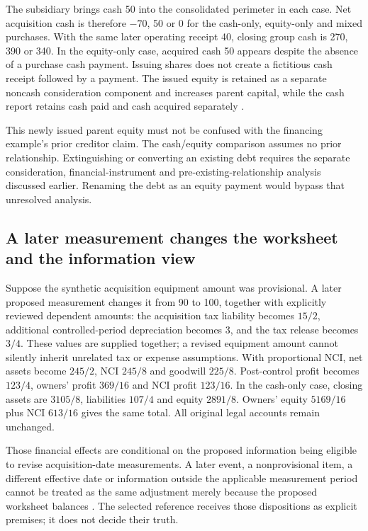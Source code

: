 The subsidiary brings cash 50 into the consolidated perimeter in each case. Net acquisition cash is therefore $-70$, 50 or 0 for the cash-only, equity-only and mixed purchases. With the same later operating receipt 40, closing group cash is 270, 390 or 340. In the equity-only case, acquired cash 50 appears despite the absence of a purchase cash payment. Issuing shares does not create a fictitious cash receipt followed by a payment. The issued equity is retained as a separate noncash consideration component and increases parent capital, while the cash report retains cash paid and cash acquired separately \citep[paras.~39--44B]{aasb107acquisition2026}.

This newly issued parent equity must not be confused with the financing example's prior creditor claim. The cash/equity comparison assumes no prior relationship. Extinguishing or converting an existing debt requires the separate consideration, financial-instrument and pre-existing-relationship analysis discussed earlier. Renaming the debt as an equity payment would bypass that unresolved analysis.

\subsection{A later measurement changes the worksheet and the information view}

Suppose the synthetic acquisition equipment amount was provisional. A later proposed measurement changes it from 90 to 100, together with explicitly reviewed dependent amounts: the acquisition tax liability becomes $15/2$, additional controlled-period depreciation becomes 3, and the tax release becomes $3/4$. These values are supplied together; a revised equipment amount cannot silently inherit unrelated tax or expense assumptions. With proportional NCI, net assets become $245/2$, NCI $245/8$ and goodwill $225/8$. Post-control profit becomes $123/4$, owners' profit $369/16$ and NCI profit $123/16$. In the cash-only case, closing assets are $3105/8$, liabilities $107/4$ and equity $2891/8$. Owners' equity $5169/16$ plus NCI $613/16$ gives the same total. All original legal accounts remain unchanged.

Those financial effects are conditional on the proposed information being eligible to revise acquisition-date measurements. A later event, a nonprovisional item, a different effective date or information outside the applicable measurement period cannot be treated as the same adjustment merely because the proposed worksheet balances \citep[paras.~45--50]{aasb3scope2026}. The selected reference receives those dispositions as explicit premises; it does not decide their truth.

